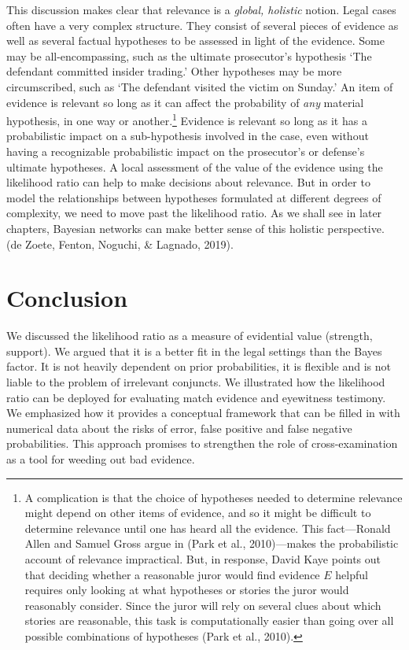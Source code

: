 \documentclass[
  10pt,
  dvipsnames,enabledeprecatedfontcommands]{scrartcl}
\begin{document}
This discussion makes clear that relevance is a
\textit{global, holistic} notion. Legal cases often have a very complex
structure. They consist of several pieces of evidence as well as several
factual hypotheses to be assessed in light of the evidence. Some may be
all-encompassing, such as the ultimate prosecutor's hypothesis `The
defendant committed insider trading.' Other hypotheses may be more
circumscribed, such as `The defendant visited the victim on Sunday.' An
item of evidence is relevant so long as it can affect the probability of
\textit{any} material hypothesis, in one way or another.\footnote{A
  complication is that the choice of hypotheses needed to determine
  relevance might depend on other items of evidence, and so it might be
  difficult to determine relevance until one has heard all the evidence.
  This fact---Ronald Allen and Samuel Gross argue in (Park et al.,
  2010)---makes the probabilistic account of relevance impractical. But,
  in response, David Kaye points out that deciding whether a reasonable
  juror would find evidence \(E\) helpful requires only looking at what
  hypotheses or stories the juror would reasonably consider. Since the
  juror will rely on several clues about which stories are reasonable,
  this task is computationally easier than going over all possible
  combinations of hypotheses (Park et al., 2010).} Evidence is relevant
so long as it has a probabilistic impact on a sub-hypothesis involved in
the case, even without having a recognizable probabilistic impact on the
prosecutor's or defense's ultimate hypotheses. A local assessment of the
value of the evidence using the likelihood ratio can help to make
decisions about relevance. But in order to model the relationships
between hypotheses formulated at different degrees of complexity, we
need to move past the likelihood ratio. As we shall see in later
chapters, Bayesian networks can make better sense of this holistic
perspective. (de Zoete, Fenton, Noguchi, \& Lagnado, 2019).

\hypertarget{conclusion}{%
\section{Conclusion}\label{conclusion}}

We discussed the likelihood ratio as a measure of evidential value
(strength, support). We argued that it is a better fit in the legal
settings than the Bayes factor. It is not heavily dependent on prior
probabilities, it is flexible and is not liable to the problem of
irrelevant conjuncts. We illustrated how the likelihood ratio can be
deployed for evaluating match evidence and eyewitness testimony. We
emphasized how it provides a conceptual framework that can be filled in
with numerical data about the risks of error, false positive and false
negative probabilities. This approach promises to strengthen the role of
cross-examination as a tool for weeding out bad evidence.
\end{document}
